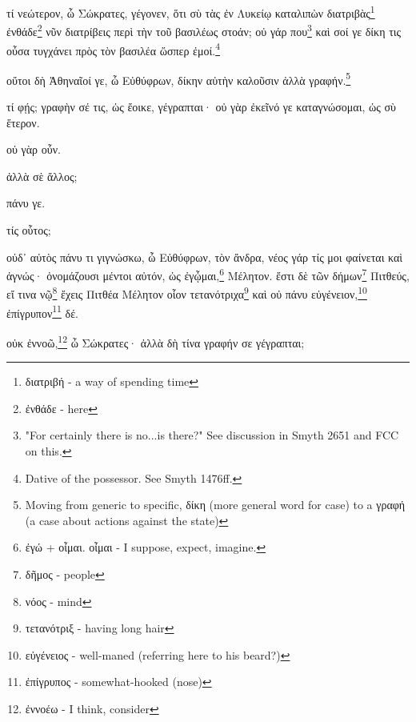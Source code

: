 \pagebreak


\versification{[2a]}
τί
νεώτερον,
ὦ
Σώκρατες,
γέγονεν,
ὅτι
σὺ
τὰς
ἐν
Λυκείῳ
καταλιπὼν
διατριβὰς\footnote{διατριβή - a way of spending time}
ἐνθάδε\footnote{ἐνθάδε - here}
νῦν
διατρίβεις
περὶ
τὴν
τοῦ
βασιλέως
στοάν;
οὐ
γάρ
που\footnote{"For certainly there is no...is there?" See discussion in Smyth 2651 and FCC on this.}
καὶ
σοί
γε
δίκη
τις
οὖσα
τυγχάνει
πρὸς
τὸν
βασιλέα
ὥσπερ
ἐμοί.\footnote{Dative of the possessor. See Smyth 1476ff.}

οὔτοι
δὴ
Ἀθηναῖοί
γε,
ὦ
Εὐθύφρων,
δίκην
αὐτὴν
καλοῦσιν
ἀλλὰ
γραφήν.\footnote{Moving from generic to specific, δίκη (more general word for case) to a γραφή (a case about actions against the state)}

\versification{[2b]}
τί
φῄς;
γραφὴν
σέ
τις,
ὡς
ἔοικε,
γέγραπται·
οὐ
γὰρ
ἐκεῖνό
γε
καταγνώσομαι,
ὡς
σὺ
ἕτερον.

οὐ
γὰρ
οὖν.

ἀλλὰ
σὲ
ἄλλος;

πάνυ
γε.

τίς
οὗτος;

οὐδ᾽
αὐτὸς
πάνυ
τι
γιγνώσκω,
ὦ
Εὐθύφρων,
τὸν
ἄνδρα,
νέος
γάρ
τίς
μοι
φαίνεται
καὶ
ἀγνώς·
ὀνομάζουσι
μέντοι
αὐτόν,
ὡς
ἐγᾦμαι,\footnote{ἐγώ + οἶμαι. οἶμαι - I suppose, expect, imagine.}
Μέλητον.
ἔστι
δὲ
τῶν
δήμων\footnote{δῆμος - people}
Πιτθεύς,
εἴ
τινα
νῷ\footnote{νόος - mind}
ἔχεις
Πιτθέα
Μέλητον
οἷον
τετανότριχα\footnote{τετανότριξ - having long hair}
καὶ
οὐ
πάνυ
εὐγένειον,\footnote{εὐγένειος - well-maned (referring here to his beard?)}
ἐπίγρυπον\footnote{ἐπίγρυπος - somewhat-hooked (nose)}
δέ.

οὐκ
ἐννοῶ,\footnote{ἐννοέω - I think, consider}
ὦ
Σώκρατες·
ἀλλὰ
δὴ
τίνα
γραφήν
\versification{[2c]}
σε
γέγραπται;

